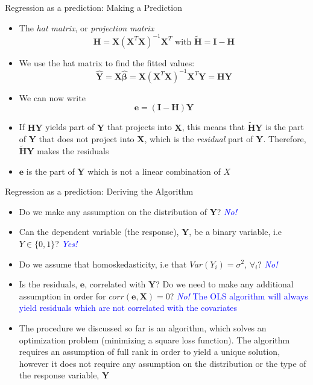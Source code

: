\documentclass[handout]{beamer}
\begin{document}
\begin{frame}{Regression as a prediction: Making a Prediction}
	\begin{itemize}
\item<+-> The \emph{hat matrix}, or \emph{projection matrix}
		\[ \mathbf{H} = \mathbf{X}(\mathbf{X}^{T}\mathbf{X})^{-1}\mathbf{X}^{T} \text{ with } \mathbf{\tilde{H}} = \mathbf{I} - \mathbf{H} \]
\item<+-> We use the hat matrix to find the fitted values:
		 $$\mathbf{\hat{Y}} = \mathbf{X\hat{\beta}} =\mathbf{ X}(\mathbf{X}^{T}\mathbf{X})^{-1}\mathbf{X}^{T}\mathbf{Y} = \mathbf{HY}$$
\item<+-> We can now write
		\[ \mathbf{e} = (\mathbf{I} - \mathbf{H})\mathbf{Y}  \]
\item<+-> If $\mathbf{HY}$ yields part of $\mathbf{Y}$ that projects into $\mathbf{X}$, this means that $\mathbf{\tilde{H}Y}$ is the part of $\mathbf{Y}$ that does not project into $\mathbf{X}$, which is the \emph{residual} part of $\mathbf{Y}$.  Therefore, $\mathbf{\tilde{H}Y}$ makes the residuals
\item<+-> $\mathbf{e}$ is the part of $\mathbf{Y}$ which is not a linear combination of $X$		
	\end{itemize}
\end{frame}

\begin{frame}{Regression as a prediction: Deriving the Algorithm}
\begin{itemize}
\item Do we make any assumption on the distribution of $\mathbf{Y}$?  \pause  \textcolor{blue}{\textit{No!}}
\pause
\item Can the dependent variable (the response), $\mathbf{Y}$, be a binary variable, i.e $Y \in \lbrace 0,1 \rbrace$?  \pause  \textcolor{blue}{\textit{Yes!}}
\pause
\item Do we assume that homoskedasticity, i.e that $Var(Y_i)=\sigma^2$, $\forall_i$?   \pause \textcolor{blue}{\textit{No!}}
\pause
\item Is the residuals, $\mathbf{e}$, correlated with $\mathbf{Y}$? Do we need to make any additional assumption in order for $corr(\mathbf{e},\mathbf{X})=0$?  \pause \textcolor{blue}{\textit{No!} The OLS algorithm will always yield residuals which are not correlated with the covariates}
\pause
\item The procedure we discussed so far is an algorithm, which solves an optimization problem (minimizing a square loss function). The algorithm requires an assumption of full rank in order to yield a unique solution, however it does not require any assumption on the distribution or the type of the response variable, $\mathbf{Y}$ 
\end{itemize}
\end{frame}
\end{document}
